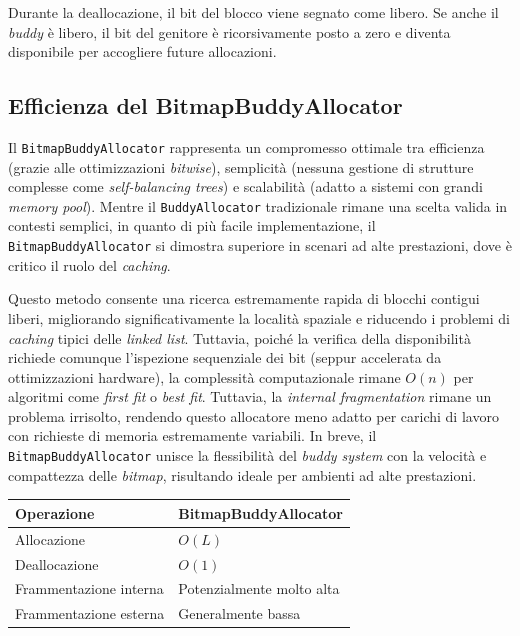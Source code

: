 Durante la deallocazione, il bit del blocco viene segnato come libero. Se anche il \textit{buddy} è libero, il bit del genitore è ricorsivamente posto a zero e diventa disponibile per accogliere future allocazioni.

\subsection*{Efficienza del BitmapBuddyAllocator}
Il \texttt{BitmapBuddyAllocator} rappresenta un compromesso ottimale tra efficienza (grazie alle ottimizzazioni \textit{bitwise}), semplicità (nessuna gestione di strutture complesse come \textit{self-balancing trees}) e scalabilità (adatto a sistemi con grandi \textit{memory pool}). Mentre il \texttt{BuddyAllocator} tradizionale rimane una scelta valida in contesti semplici, in quanto di più facile implementazione, il \texttt{BitmapBuddyAllocator} si dimostra superiore in scenari ad alte prestazioni, dove è critico il ruolo del \textit{caching}. 

Questo metodo consente una ricerca estremamente rapida di blocchi contigui liberi, migliorando significativamente la località spaziale e riducendo i problemi di \textit{caching} tipici delle \textit{linked list}. Tuttavia, poiché la verifica della disponibilità richiede comunque l’ispezione sequenziale dei bit (seppur accelerata da ottimizzazioni hardware), la complessità computazionale rimane $O(n)$ per algoritmi come \textit{first fit} o \textit{best fit}. Tuttavia, la \textit{internal fragmentation} rimane un problema irrisolto, rendendo questo allocatore meno adatto per carichi di lavoro con richieste di memoria estremamente variabili. In breve, il \texttt{BitmapBuddyAllocator} unisce la flessibilità del \textit{buddy system} con la velocità e compattezza delle \textit{bitmap}, risultando ideale per ambienti ad alte prestazioni.

\begin{center}
\begin{tabular}{|l|l|}
\hline
Operazione & BitmapBuddyAllocator \\
\hline
Allocazione & $O(L)$ \\
Deallocazione & $O(1)$ \\
Frammentazione interna & Potenzialmente molto alta \\
Frammentazione esterna & Generalmente bassa \\
\hline
\end{tabular}
\end{center}
